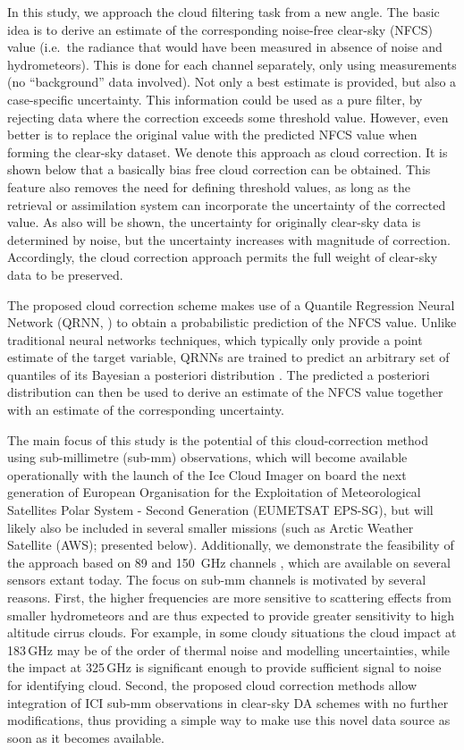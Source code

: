 \documentclass[amt, manuscript]{copernicus}
\begin{document}
In this study, we approach the cloud filtering task from a new angle. The basic idea
is to derive an estimate of the corresponding noise-free clear-sky (NFCS) value
(i.e.\ the radiance that would have been measured in absence of noise and
hydrometeors). This is done for each channel separately, only using
measurements (no ``background'' data involved). Not only a best estimate is
provided, but also a case-specific uncertainty. This information could be used as a pure filter, by rejecting data where the correction exceeds some threshold value. However, even
better is to replace the original value with the predicted NFCS value when
forming the clear-sky dataset. We denote this approach as cloud correction. It
is shown below that a basically bias free cloud correction can be obtained.
This feature also removes the need for defining threshold values, as long as the retrieval or
assimilation system can incorporate the uncertainty of the corrected value. As
also will be shown, the uncertainty for originally clear-sky data is determined
by noise, but the uncertainty increases with magnitude of correction.
Accordingly, the cloud correction approach permits the full weight of
clear-sky data to be preserved.

The proposed cloud correction scheme makes use of a Quantile Regression Neural
Network (QRNN, \citet{pfreundschuh:aneur:18}) to obtain a probabilistic prediction of the NFCS value. Unlike traditional neural networks techniques, which typically only provide a point
estimate of the target variable, QRNNs are trained to predict an arbitrary set
of quantiles of its Bayesian a posteriori distribution
\citep{pfreundschuh:aneur:18}. The predicted a posteriori distribution 
can then be used to derive an estimate of the NFCS value together with an estimate
of the corresponding uncertainty.

The main focus of this study is the potential of this cloud-correction
method using sub-millimetre (sub-mm) observations, which will become available
operationally with the launch of the Ice Cloud Imager \citep[ICI,][]{eriksson:towar:20} on board the next generation of European Organisation for the Exploitation of Meteorological Satellites Polar System - Second Generation (EUMETSAT EPS-SG), but will likely also be included in
several smaller missions (such as Arctic Weather Satellite (AWS); presented
below). Additionally, we demonstrate the feasibility of the approach based on
89 and 150\ GHz channels \citep[following][]{geer2015scatteringindex}, which are available on several sensors extant today. The focus
on sub-mm channels is motivated by several reasons. First, the higher
frequencies are more sensitive to scattering effects from smaller
hydrometeors and are thus expected to provide greater sensitivity to high altitude cirrus clouds. For example, in some cloudy situations the
cloud impact at 183\,GHz may be of the order of thermal noise and modelling uncertainties,
while the impact at 325\,GHz is significant enough to provide sufficient signal to noise for identifying cloud. Second, the proposed
cloud correction methods allow integration of ICI sub-mm observations in
clear-sky DA schemes with no further modifications, thus providing a simple
way to make use this novel data source as soon as it becomes available.
\end{document}
